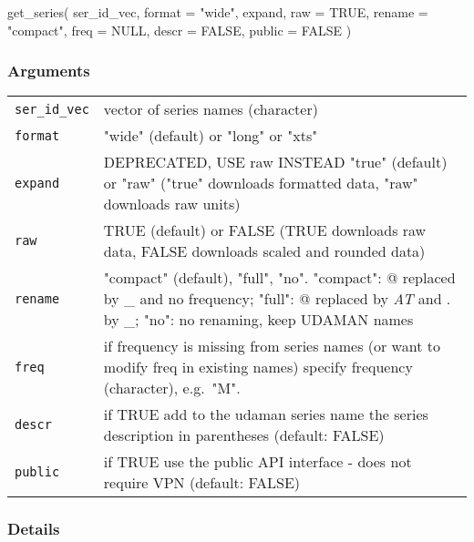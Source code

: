 \documentclass[
  letterpaper,
  DIV=11,
  numbers=noendperiod]{scrreport}
\newenvironment{Shaded}{\begin{snugshade}}{\end{snugshade}}
\newcommand{\AttributeTok}[1]{\textcolor[rgb]{0.40,0.45,0.13}{#1}}
\newcommand{\ConstantTok}[1]{\textcolor[rgb]{0.56,0.35,0.01}{#1}}
\newcommand{\FunctionTok}[1]{\textcolor[rgb]{0.28,0.35,0.67}{#1}}
\newcommand{\NormalTok}[1]{\textcolor[rgb]{0.00,0.23,0.31}{#1}}
\newcommand{\StringTok}[1]{\textcolor[rgb]{0.13,0.47,0.30}{#1}}
\begin{document}
\begin{Shaded}
\begin{Highlighting}[]
\FunctionTok{get\_series}\NormalTok{(}
\NormalTok{  ser\_id\_vec,}
  \AttributeTok{format =} \StringTok{"wide"}\NormalTok{,}
\NormalTok{  expand,}
  \AttributeTok{raw =} \ConstantTok{TRUE}\NormalTok{,}
  \AttributeTok{rename =} \StringTok{"compact"}\NormalTok{,}
  \AttributeTok{freq =} \ConstantTok{NULL}\NormalTok{,}
  \AttributeTok{descr =} \ConstantTok{FALSE}\NormalTok{,}
  \AttributeTok{public =} \ConstantTok{FALSE}
\NormalTok{)}
\end{Highlighting}
\end{Shaded}

\subsubsection{Arguments}\label{arguments}

\begin{longtable}[]{@{}ll@{}}
\toprule\noalign{}
\endhead
\bottomrule\noalign{}
\endlastfoot
\texttt{ser\_id\_vec} & vector of series names (character) \\
\texttt{format} & "wide" (default) or "long" or "xts" \\
\texttt{expand} & DEPRECATED, USE raw INSTEAD "true" (default) or "raw"
("true" downloads formatted data, "raw" downloads raw units) \\
\texttt{raw} & TRUE (default) or FALSE (TRUE downloads raw data, FALSE
downloads scaled and rounded data) \\
\texttt{rename} & "compact" (default), "full", "no". "compact": @
replaced by \_ and no frequency; "full": @ replaced by \emph{AT} and .
by \_; "no": no renaming, keep UDAMAN names \\
\texttt{freq} & if frequency is missing from series names (or want to
modify freq in existing names) specify frequency (character),
e.g.~"M". \\
\texttt{descr} & if TRUE add to the udaman series name the series
description in parentheses (default: FALSE) \\
\texttt{public} & if TRUE use the public API interface - does not
require VPN (default: FALSE) \\
\end{longtable}

\subsubsection{Details}\label{details}
\end{document}
